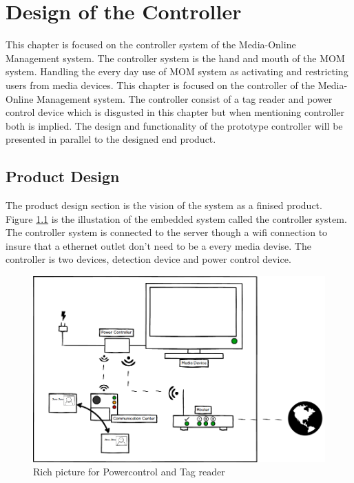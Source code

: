 \chapter{Design of the Controller}
\label{chap:controller}
This chapter is focused on the controller system of the Media-Online Management system. The controller system is the hand and mouth of the MOM system. Handling the every day use of MOM system as activating and restricting users from media devices.\newline
This chapter is focused on the controller of the Media-Online Management system. The controller consist of a tag reader and power control device which is disgusted in this chapter but when mentioning controller both is implied. \newline
The design and functionality of the prototype controller will be presented in parallel to the designed end product. \newline

\section{Product Design}

The product design section is the vision of the system as a finised product. Figure \ref{fig:Power&Tagdevice} is the illustation of the embedded system called the controller system. The controller system is connected to the server though a wifi connection to insure that a ethernet outlet don't need to be a every media devise.  
The controller is two devices, detection device and power control device.

\begin{figure}[h]
	\centering
		\includegraphics[width=1.00\textwidth]{images/Power&Tagdevice.png}
	\caption{Rich picture for Powercontrol and Tag reader}
	\label{fig:Power&Tagdevice}
\end{figure}

